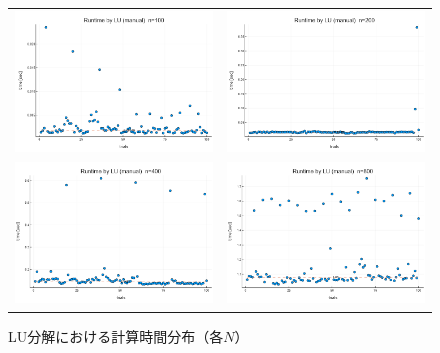 \documentclass[a4paper,11pt]{ltjsarticle}
\begin{document}
    \begin{figure}[H]
    \centering
    \begin{tabular}{cc}
    \includegraphics[width=72mm]{graphs/exp2_n100_time.png} &
    \includegraphics[width=72mm]{graphs/exp2_n200_time.png} \\
    \includegraphics[width=72mm]{graphs/exp2_n400_time.png} &
    \includegraphics[width=72mm]{graphs/exp2_n800_time.png} \\
  \end{tabular}
  \caption{LU分解における計算時間分布（各$N$）}
  \label{fig:exp2_times}
\end{figure}
\end{document}
